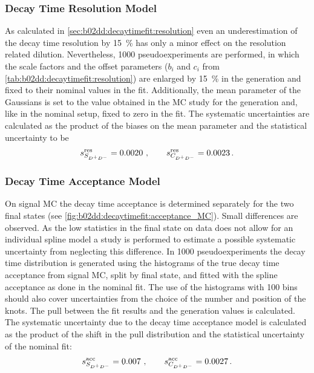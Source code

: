 \subsubsection{Decay Time Resolution Model}
\label{sec:systematics:decaytimeresolution}

As calculated in \cref{sec:b02dd:decaytimefit:resolution} even an
underestimation of the decay time resolution by \SI{15}{\percent} has only a
minor effect on the resolution related dilution. Nevertheless, \num{1000}
pseudoexperiments are performed, in which the scale factors and the offset
parameters ($b_i$ and $c_i$ from \cref{tab:b02dd:decaytimefit:resolution}) are
enlarged by \SI{15}{\percent} in the generation and fixed to their nominal
values in the fit. Additionally, the mean parameter of the Gaussians is set to
the value obtained in the MC study for the generation and, like in the nominal
setup, fixed to zero in the fit. The systematic uncertainties are calculated
as the product of the biases on the mean parameter and the statistical
uncertainty to be
\begin{align*}
s_{S_{{{D}^+}{{D}^-}}}^{\text{res}} = \num{0.0020}\ , \qquad s_{C_{{{D}^+}{{D}^-}}}^{\text{res}} = \num{0.0023}\,.
\end{align*}

\subsubsection{Decay Time Acceptance Model}
\label{sec:systematics:decaytimeacceptance}

On signal MC the decay time acceptance is determined separately for the two
final states (see \cref{fig:b02dd:decaytimefit:acceptance_MC}). Small
differences are observed. As the low statistics in the \KKpiKpipi final state
on data does not allow for an individual spline model a study is performed to
estimate a possible systematic uncertainty from neglecting this difference. In
\num{1000} pseudoexperiments the decay time distribution is generated using
the histograms of the true decay time acceptance from signal MC, split by
final state, and fitted with the spline acceptance as done in the nominal fit.
The use of the histograms with \num{100} bins should also cover uncertainties
from the choice of the number and position of the knots. The pull between the
fit results and the generation values is calculated. The systematic
uncertainty due to the decay time acceptance model is calculated as the
product of the shift in the pull distribution and the statistical uncertainty
of the nominal fit:
\begin{align*}
s_{S_{{{D}^+}{{D}^-}}}^{\textrm{acc}} = \num{0.007}\ , \qquad s_{C_{{{D}^+}{{D}^-}}}^{\textrm{acc}} = \num{0.0027}\,.
\end{align*}
